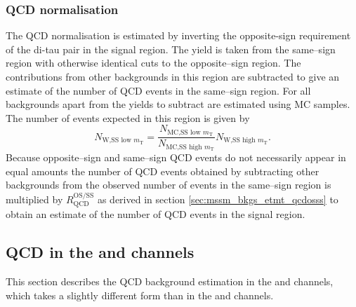 \subsubsection{QCD normalisation}
\label{sec:mssm_bkgs_etmt_qcdnorm}
The QCD normalisation is estimated by inverting the opposite-sign requirement
of the di-tau pair in the signal region. The yield is taken from the same--sign
region with otherwise identical cuts to the opposite--sign region. The contributions
from other backgrounds in this region are subtracted to give an estimate of the number
of QCD events in the same--sign region. For all backgrounds apart from \Wjets the
yields to subtract are estimated using \ac{MC} samples. The number of \Wjets events
expected in this region is given by
\begin{equation}\label{eqn:wjets_qcdsub}
N_{\text{W,SS low }m_{\text{T}}} = \frac{N_{\text{MC,SS low }m_{\text{T}}}}{N_{\text{MC,SS high }m_{\text{T}}}}N_{\text{W,SS high }m_{\text{T}}}.
\end{equation}
Because opposite--sign and same--sign QCD events do not
necessarily appear in equal amounts the number of QCD
events obtained by subtracting other backgrounds from the
observed number of events in the same--sign region is multiplied
by $R_{\text{QCD}}^{\text{OS/SS}}$ as derived in section \ref{sec:mssm_bkgs_etmt_qcdosss} 
to obtain an estimate of the number of QCD events in the signal region.

\subsection{\texorpdfstring{QCD in the \tautau and \emu channels}{QCD in the tautau and emu channels}}
\label{sec:mssm_bkgs_qcd}
This section describes the QCD background
estimation in the \tautau and \emu channels, which takes a slightly
different form than in the \mutau and \etau channels.


